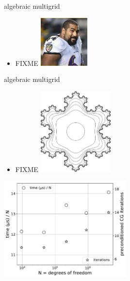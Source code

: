 \documentclass[hide notes,intlimits,usenames,dvipsnames]{beamer}
\begin{document}
\begin{frame}{algebraic multigrid}
\begin{itemize}
\item FIXME   \includegraphics[width=0.2\textwidth]{figs/urschel}
\end{itemize}
\end{frame}


\begin{frame}{algebraic multigrid}
\begin{itemize}
\item FIXME   \includegraphics[width=0.3\textwidth]{figs/snowflake}
\end{itemize}

\begin{center}
\includegraphics[width=0.5\textwidth]{figs/gamgopt}
\end{center}
\end{frame}
\end{document}
